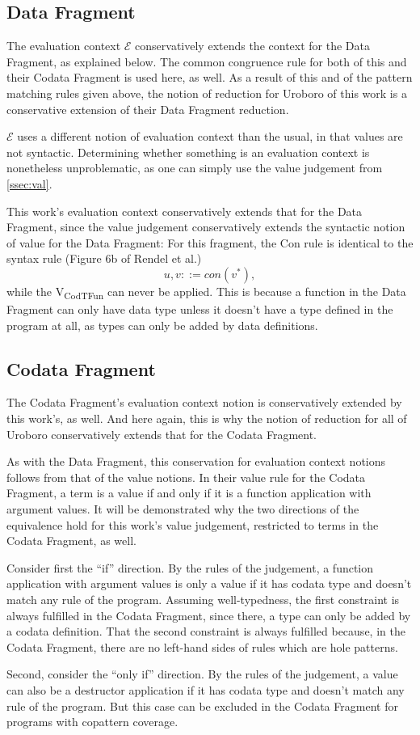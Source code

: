 \subsection{Data Fragment}
\label{ssec:df}

The evaluation context $\mathcal{E}$ conservatively extends the context for the Data Fragment, as explained below. The common congruence rule for both of this and their Codata Fragment is used here, as well. As a result of this and of the pattern matching rules given above, the notion of reduction for Uroboro of this work is a conservative extension of their Data Fragment reduction.

$\mathcal{E}$ uses a different notion of evaluation context than the usual, in that values are not syntactic. Determining whether something is an evaluation context is nonetheless unproblematic, as one can simply use the value judgement from \autoref{ssec:val}.

This work's evaluation context conservatively extends that for the Data Fragment, since the value judgement conservatively extends the syntactic notion of value for the Data Fragment: For this fragment, the Con rule is identical to the syntax rule (Figure 6b of Rendel et al.\cite{rendel15automatic})
\[
u, v ::= con(v^*),
\]
while the V\textsubscript{CodTFun} can never be applied. This is because a function in the Data Fragment can only have data type unless it doesn't have a type defined in the program at all, as types can only be added by data definitions.

\subsection{Codata Fragment}
\label{ssec:codf}

The Codata Fragment's evaluation context notion is conservatively extended by this work's, as well. And here again, this is why the notion of reduction for all of Uroboro conservatively extends that for the Codata Fragment.

As with the Data Fragment, this conservation for evaluation context notions follows from that of the value notions. In their value rule for the Codata Fragment, a term is a value if and only if it is a function application with argument values. It will be demonstrated why the two directions of the equivalence hold for this work's value judgement, restricted to terms in the Codata Fragment, as well.

Consider first the ``if'' direction. By the rules of the judgement, a function application with argument values is only a value if it has codata type and doesn't match any rule of the program. Assuming well-typedness, the first constraint is always fulfilled in the Codata Fragment, since there, a type can only be added by a codata definition. That the second constraint is always fulfilled because, in the Codata Fragment, there are no left-hand sides of rules which are hole patterns.

Second, consider the ``only if'' direction. By the rules of the judgement, a value can also be a destructor application if it has codata type and doesn't match any rule of the program. But this case can be excluded in the Codata Fragment for programs with copattern coverage.

